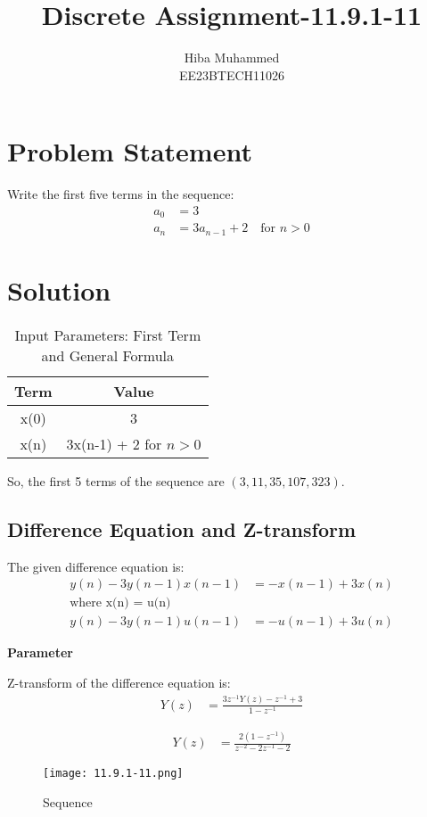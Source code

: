 \documentclass[12pt]{article}
\title{Discrete Assignment-11.9.1-11}
\author{Hiba Muhammed \\
        EE23BTECH11026}
\date{}
\newcommand{\brak}[1]{\left( #1 \right)}
\begin{document}
\maketitle

\section*{Problem Statement}
Write the first five terms in the sequence:
\begin{align}
a_{0}  &= 3 \\
a_{n}  &= 3a_{n-1} + 2 \quad \text{for } n > 0
\end{align}

\section*{Solution}

\begin{table}[h]
  \centering
  \caption{Input Parameters: First Term and General Formula}
  \begin{tabular}{|c|c|}
    \hline
    \textbf{Term} & \textbf{Value} \\
    \hline
    x(0) & 3 \\
    x(n) & 3x(n-1) + 2 for $n > 0$ \\
    \hline
  \end{tabular}
\end{table}

So, the first 5 terms of the sequence are $\brak{3, 11, 35, 107, 323}$.


\subsection*{Difference Equation and Z-transform}

The given difference equation is:
\begin{align}
y(n) - 3y(n-1)x(n-1) &=- x(n-1) + 3x(n) \\
\text {where x(n) = u(n)} \\
y(n) - 3y(n-1)u(n-1) &=- u(n-1) + 3u(n)
\end{align}

\textbf{Parameter}

Z-transform of the difference equation is:
\begin{align}
Y(z) &= \frac{3z^{-1}Y(z) - z^{-1} + 3}{1 - z^{-1}}
\end{align}

\begin{align}
Y(z) &= \frac{2(1 - z^{-1})}{z^{-2} - 2z^{-1} - 2}
\end{align}

\begin{figure}[h]
    \centering
    \texttt{[image: 11.9.1-11.png]}
    \caption{Sequence}
\end{figure}
\end{document}
